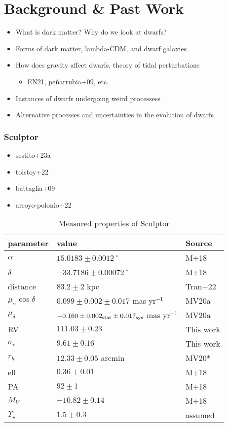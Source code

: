 \section{Background \& Past Work}\label{background-past-work}

\begin{itemize}
\tightlist
\item
  What is dark matter? Why do we look at dwarfs?
\item
  Forms of dark matter, lambda-CDM, and dwarf galaxies
\item
  How does gravity affect dwarfs, theory of tidal perturbations

  \begin{itemize}
  \tightlist
  \item
    EN21, peñarrubia+09, etc.
  \end{itemize}
\item
  Instances of dwarfs undergoing weird processess
\item
  Alternative processes and uncertainties in the evolution of dwarfs
\end{itemize}

\subsubsection{Sculptor}\label{sculptor}

\begin{itemize}
\tightlist
\item
  sestito+23a
\item
  tolstoy+22
\item
  battaglia+09
\item
  arroyo-polonio+22
\end{itemize}

\begin{table*}[t]
\centering
\caption{Measured properties of Sculptor}
\label{tbl:Measured-properties-of-Sculptor}
\begin{tabular}{lll}
\toprule
parameter & value & Source\\
\midrule
$\alpha$ & $15.0183 \pm 0.0012$˚ & M+18\\
$\delta$ & $-33.7186 \pm 0.00072$˚ & M+18\\
distance & $83.2 \pm 2$ kpc & Tran+22\\
$\mu_\alpha \cos \delta$ & $0.099 \pm 0.002 \pm 0.017$ mas yr$^{-1}$ & MV20a\\
$\mu_\delta$ & $-0.160 \pm 0.002_{\rm stat} \pm 0.017_{\rm sys}$ mas yr$^{-1}$ & MV20a\\
RV & $111.03 \pm 0.23$ & This work\\
$\sigma_v$ & $9.61\pm0.16$ & This work\\
$r_h$ & $12.33 \pm 0.05$ arcmin & MV20*\\
ell & $0.36 \pm 0.01$ & M+18\\
PA & $92\pm1$ & M+18\\
$M_V$ & $-10.82\pm0.14$ & M+18\\
$\Upsilon_\star$ & $1.5 \pm 0.3$ & assumed\\
\bottomrule
\end{tabular}
\end{table*}

